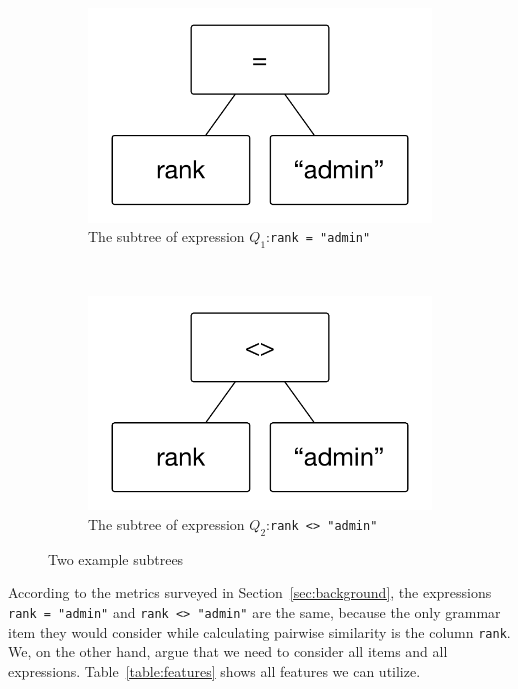 \begin{figure}[h!]
\captionsetup[subfigure]{justification=centering}
    \centering
    \begin{subfigure}[b]{0.22\textwidth}
        \includegraphics[width=\textwidth]{graphics/ex_subtree2}
        \caption{The subtree of expression $Q_1$:\texttt{rank = "admin"}}
        \label{fig:subtree1}
    \end{subfigure}
    ~ 
    \begin{subfigure}[b]{0.22\textwidth}
        \includegraphics[width=\textwidth]{graphics/ex_subtree1}
        \caption{The subtree of expression $Q_2$:\texttt{rank <> "admin"}}
        \label{fig:subtree2}
    \end{subfigure}
    \caption{Two example subtrees}
    \label{fig:subtrees}
\end{figure}

According to the metrics surveyed in Section~\ref{sec:background}, the expressions \texttt{rank = "admin"} and \texttt{rank <> "admin"} are the same, because the only grammar item they would consider while calculating pairwise similarity is the column \texttt{rank}. We, on the other hand, argue that we need to consider all items and all expressions. Table~\ref{table:features} shows all features we can utilize. 

